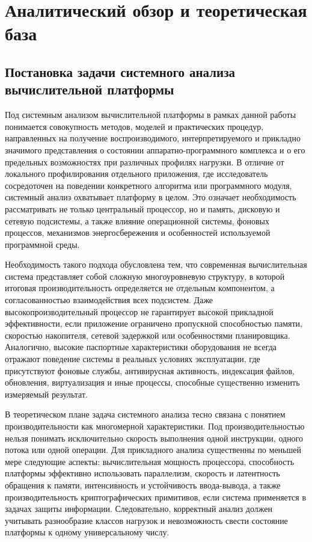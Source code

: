 \chapter{Аналитический обзор и теоретическая база}
\label{ch:overview}

\section{Постановка задачи системного анализа вычислительной платформы}

Под системным анализом вычислительной платформы в рамках данной работы понимается совокупность методов, моделей и практических процедур, направленных на получение воспроизводимого, интерпретируемого и прикладно значимого представления о состоянии аппаратно-программного комплекса и о его предельных возможностях при различных профилях нагрузки. В отличие от локального профилирования отдельного приложения, где исследователь сосредоточен на поведении конкретного алгоритма или программного модуля, системный анализ охватывает платформу в целом. Это означает необходимость рассматривать не только центральный процессор, но и память, дисковую и сетевую подсистемы, а также влияние операционной системы, фоновых процессов, механизмов энергосбережения и особенностей используемой программной среды.

Необходимость такого подхода обусловлена тем, что современная вычислительная система представляет собой сложную многоуровневую структуру, в которой итоговая производительность определяется не отдельным компонентом, а согласованностью взаимодействия всех подсистем. Даже высокопроизводительный процессор не гарантирует высокой прикладной эффективности, если приложение ограничено пропускной способностью памяти, скоростью накопителя, сетевой задержкой или особенностями планировщика. Аналогично, высокие паспортные характеристики оборудования не всегда отражают поведение системы в реальных условиях эксплуатации, где присутствуют фоновые службы, антивирусная активность, индексация файлов, обновления, виртуализация и иные процессы, способные существенно изменить измеряемый результат.

В теоретическом плане задача системного анализа тесно связана с понятием производительности как многомерной характеристики. Под производительностью нельзя понимать исключительно скорость выполнения одной инструкции, одного потока или одной операции. Для прикладного анализа существенны по меньшей мере следующие аспекты: вычислительная мощность процессора, способность платформы эффективно использовать параллелизм, скорость и латентность обращения к памяти, интенсивность и устойчивость ввода-вывода, а также производительность криптографических примитивов, если система применяется в задачах защиты информации. Следовательно, корректный анализ должен учитывать разнообразие классов нагрузок и невозможность свести состояние платформы к одному универсальному числу.

